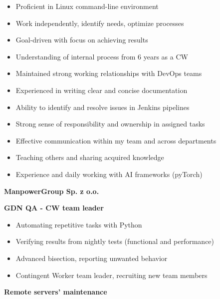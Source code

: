 \documentclass[10pt,a4paper,ragged2e,withhyper]{altacv/altacv}
\begin{document}
\begin{paracol}{2}


\begin{itemize}
\item Proficient in Linux command-line environment
\item Work independently, identify needs, optimize processes
\item Goal-driven with focus on achieving results
\item Understanding of internal process from 6 years as a CW
\item Maintained strong working relationships with DevOps teams
\item Experienced in writing clear and concise documentation
\item Ability to identify and resolve issues in Jenkins pipelines
\item Strong sense of responsibility and ownership in assigned tasks
\item Effective communication within my team and across departments
\item Teaching others and sharing acquired knowledge
\item Experience and daily working with AI frameworks (pyTorch)
\end{itemize}


\large\textbf{ManpowerGroup Sp. z o.o.} \normalsize

\medskip

\textbf{\textcolor{accent}{GDN QA - CW team leader}} \hfill {}

\smallskip

\begin{itemize}
\item Automating repetitive tasks with Python
\item Verifying results from nightly tests (functional and performance)
\item Advanced bisection, reporting unwanted behavior
\item Contingent Worker team leader, recruiting new team members
\end{itemize}

\medskip

\textbf{\textcolor{accent}{Remote servers’ maintenance}} \hfill {}
\smallskip


\end{paracol}
\end{document}
